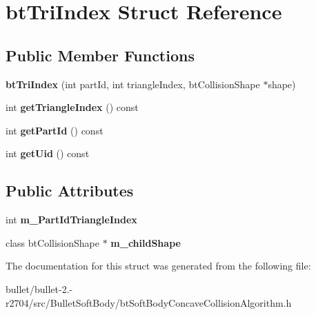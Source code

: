 \hypertarget{structbt_tri_index}{\section{bt\+Tri\+Index Struct Reference}
\label{structbt_tri_index}
}
\subsection*{Public Member Functions}
\begin{DoxyCompactItemize}
\item 
\hypertarget{structbt_tri_index_acd3cb31e57c199688fc52514739ade2f}{{\bfseries bt\+Tri\+Index} (int part\+Id, int triangle\+Index, bt\+Collision\+Shape $\ast$shape)}\label{structbt_tri_index_acd3cb31e57c199688fc52514739ade2f}

\item 
\hypertarget{structbt_tri_index_adfc5a888d295d74285c18b71e88b725a}{int {\bfseries get\+Triangle\+Index} () const }\label{structbt_tri_index_adfc5a888d295d74285c18b71e88b725a}

\item 
\hypertarget{structbt_tri_index_a1a1ce11a82c0184b48ffcf54fa0cc9e3}{int {\bfseries get\+Part\+Id} () const }\label{structbt_tri_index_a1a1ce11a82c0184b48ffcf54fa0cc9e3}

\item 
\hypertarget{structbt_tri_index_ac6b1f0314dc8ffa5a5662e95c7db0b82}{int {\bfseries get\+Uid} () const }\label{structbt_tri_index_ac6b1f0314dc8ffa5a5662e95c7db0b82}

\end{DoxyCompactItemize}
\subsection*{Public Attributes}
\begin{DoxyCompactItemize}
\item 
\hypertarget{structbt_tri_index_acd9ff9834da232fbec86aba2067c18ad}{int {\bfseries m\+\_\+\+Part\+Id\+Triangle\+Index}}\label{structbt_tri_index_acd9ff9834da232fbec86aba2067c18ad}

\item 
\hypertarget{structbt_tri_index_abb7205518a0f9cd64d0131a734a12a5a}{class bt\+Collision\+Shape $\ast$ {\bfseries m\+\_\+child\+Shape}}\label{structbt_tri_index_abb7205518a0f9cd64d0131a734a12a5a}

\end{DoxyCompactItemize}


The documentation for this struct was generated from the following file\+:\begin{DoxyCompactItemize}
\item 
bullet/bullet-\/2.-\/r2704/src/\+Bullet\+Soft\+Body/bt\+Soft\+Body\+Concave\+Collision\+Algorithm.\+h\end{DoxyCompactItemize}
